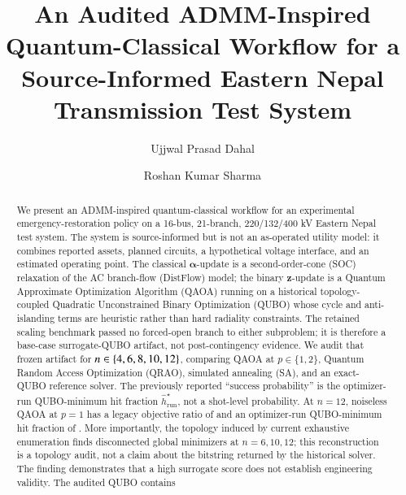 \documentclass[5p,twocolumn,number,sort&compress,nopreprintline]{elsarticle}
\begin{document}
\begin{frontmatter}

\title{An Audited ADMM-Inspired Quantum-Classical Workflow for a
Source-Informed Eastern Nepal Transmission Test System}

\author[inst1]{Ujjwal Prasad Dahal}

\author[inst1]{Roshan Kumar Sharma}




\begin{abstract}
We present an ADMM-inspired quantum-classical workflow for an
experimental emergency-restoration policy on a 16-bus, 21-branch,
220/132/400 kV Eastern Nepal test system. The system is source-informed
but is not an as-operated utility model: it combines reported assets,
planned circuits, a hypothetical voltage interface, and an estimated
operating point. The classical
$\boldsymbol\alpha$-update
is a second-order-cone (SOC) relaxation of the AC branch-flow (DistFlow)
model; the binary $\boldsymbol z$-update is
a Quantum Approximate Optimization Algorithm (QAOA) running on a
historical topology-coupled Quadratic Unconstrained Binary Optimization
(QUBO) whose cycle and anti-islanding terms are heuristic rather than
hard radiality constraints.
The retained scaling benchmark passed no forced-open branch to either
subproblem; it is therefore a base-case surrogate-QUBO artifact, not
post-contingency evidence. We audit that frozen artifact for
$n\in\{4,6,8,10,12\}$, comparing QAOA at $p\in\{1,2\}$, Quantum
Random Access Optimization (QRAO), simulated annealing (SA), and an
exact-QUBO reference solver. The previously reported ``success probability''
is the optimizer-run QUBO-minimum hit fraction
$\widehat h_{\mathrm{run}}^\star$, not a shot-level probability. At
$n=12$, noiseless QAOA at
$p=1$ has a legacy objective ratio of \QAOApOneTwelveRatio{} and an
optimizer-run QUBO-minimum hit fraction of
\QAOApOneTwelveHitFraction{}. More importantly, the topology induced by
current exhaustive enumeration finds disconnected global minimizers at
$n=6,10,12$; this reconstruction is a topology audit, not a claim about
the bitstring returned by the historical solver. The finding demonstrates
that a high surrogate score does not establish engineering validity.
The audited QUBO contains

\end{abstract}
\end{frontmatter}
\end{document}
